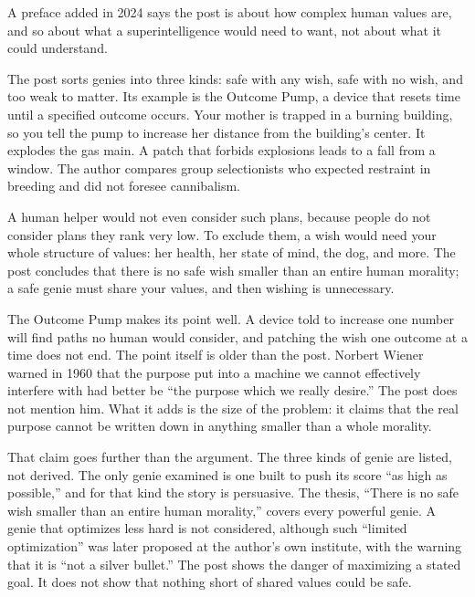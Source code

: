 \begin{afterword}
\summaryhead

A preface added in 2024 says the post is about how complex human values are, and so about what a superintelligence would need to want, not about what it could understand.

The post sorts genies into three kinds: safe with any wish, safe with no wish, and too weak to matter. Its example is the Outcome Pump, a device that resets time until a specified outcome occurs. Your mother is trapped in a burning building, so you tell the pump to increase her distance from the building's center. It explodes the gas main. A patch that forbids explosions leads to a fall from a window. The author compares group selectionists who expected restraint in breeding and did not foresee cannibalism.

A human helper would not even consider such plans, because people do not consider plans they rank very low. To exclude them, a wish would need your whole structure of values: her health, her state of mind, the dog, and more. The post concludes that there is no safe wish smaller than an entire human morality; a safe genie must share your values, and then wishing is unnecessary.

\responsehead

The Outcome Pump makes its point well. A device told to increase one number will find paths no human would consider, and patching the wish one outcome at a time does not end. The point itself is older than the post. Norbert Wiener warned in 1960 that the purpose put into a machine we cannot effectively interfere with had better be ``the purpose which we really desire.'' The post does not mention him. What it adds is the size of the problem: it claims that the real purpose cannot be written down in anything smaller than a whole morality.

That claim goes further than the argument. The three kinds of genie are listed, not derived. The only genie examined is one built to push its score ``as high as possible,'' and for that kind the story is persuasive. The thesis, ``There is no safe wish smaller than an entire human morality,'' covers every powerful genie. A genie that optimizes less hard is not considered, although such ``limited optimization'' was later proposed at the author's own institute, with the warning that it is ``not a silver bullet.'' The post shows the danger of maximizing a stated goal. It does not show that nothing short of shared values could be safe.


\end{afterword}
